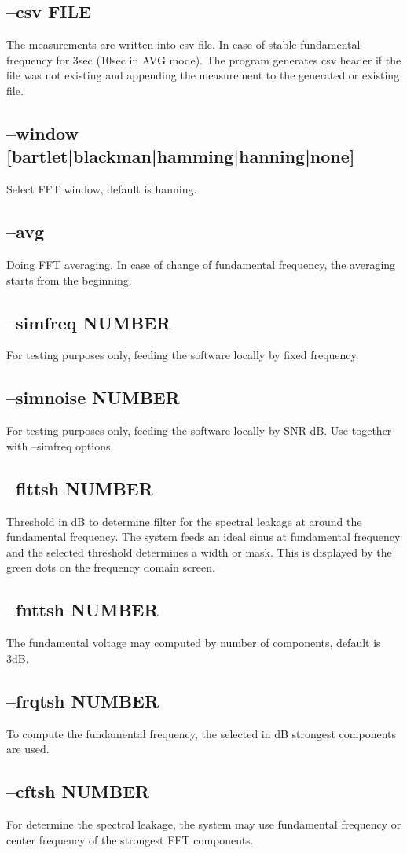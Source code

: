 \documentclass[10pt,a4paper]{article}
\begin{document}
\subsection{--csv FILE}
The measurements are written into csv file. In case of stable fundamental frequency for 3sec (10sec in AVG mode). The program generates csv header if the file was not existing and appending the measurement to the generated or existing file.
\subsection{--window [bartlet|blackman|hamming|hanning|none]}
Select FFT window, default is hanning.
\subsection{--avg}
Doing FFT averaging. In case of change of fundamental frequency, the averaging starts from the beginning.
\subsection{--simfreq NUMBER}
For testing purposes only, feeding the software locally by fixed frequency.
\subsection{--simnoise NUMBER}
For testing purposes only, feeding the software locally by SNR dB. Use together with --simfreq options.
\subsection{--flttsh NUMBER}
Threshold in dB to determine filter for the spectral leakage at around the fundamental frequency. The system feeds an ideal sinus at fundamental frequency and the selected threshold determines a width or mask. This is displayed by the green dots on the frequency domain screen.
\subsection{--fnttsh NUMBER}
The fundamental voltage may computed by number of components, default is 3dB.
\subsection{--frqtsh NUMBER}
To compute the fundamental frequency, the selected in dB strongest components are used.
\subsection{--cftsh NUMBER}
For determine the spectral leakage, the system may use fundamental frequency or center frequency of the strongest FFT components.
\end{document}
